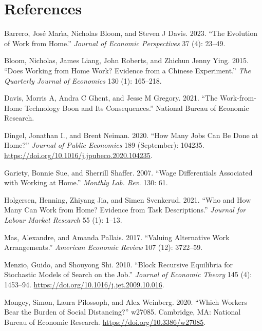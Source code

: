 \documentclass[
  11pt,
  letterpaper,
  DIV=11,
  numbers=noendperiod]{scrartcl}
\newlength{\cslhangindent}
\newenvironment{CSLReferences}[2] %
 {\begin{list}{}{%
  \setlength{\itemindent}{0pt}
  \setlength{\leftmargin}{0pt}
  \setlength{\parsep}{0pt}
  \ifodd #1
   \setlength{\leftmargin}{\cslhangindent}
   \setlength{\itemindent}{-1\cslhangindent}
  \fi
  \setlength{\itemsep}{#2\baselineskip}}}
 {\end{list}}
\theoremstyle{plain}
\theoremstyle{remark}
\begin{document}
\section*{References}\label{references}

\label{refs}
\begin{CSLReferences}{1}{0}
Barrero, José Marı́a, Nicholas Bloom, and Steven J Davis. 2023. {``The
Evolution of Work from Home.''} \emph{Journal of Economic Perspectives}
37 (4): 23--49.

Bloom, Nicholas, James Liang, John Roberts, and Zhichun Jenny Ying.
2015. {``Does Working from Home Work? Evidence from a Chinese
Experiment.''} \emph{The Quarterly Journal of Economics} 130 (1):
165--218.

Davis, Morris A, Andra C Ghent, and Jesse M Gregory. 2021. {``The
Work-from-Home Technology Boon and Its Consequences.''} National Bureau
of Economic Research.

Dingel, Jonathan I., and Brent Neiman. 2020. {``How Many Jobs Can Be
Done at Home?''} \emph{Journal of Public Economics} 189 (September):
104235. \url{https://doi.org/10.1016/j.jpubeco.2020.104235}.

Gariety, Bonnie Sue, and Sherrill Shaffer. 2007. {``Wage Differentials
Associated with Working at Home.''} \emph{Monthly Lab. Rev.} 130: 61.

Holgersen, Henning, Zhiyang Jia, and Simen Svenkerud. 2021. {``Who and
How Many Can Work from Home? Evidence from Task Descriptions.''}
\emph{Journal for Labour Market Research} 55 (1): 1--13.

Mas, Alexandre, and Amanda Pallais. 2017. {``Valuing Alternative Work
Arrangements.''} \emph{American Economic Review} 107 (12): 3722--59.

Menzio, Guido, and Shouyong Shi. 2010. {``Block Recursive Equilibria for
Stochastic Models of Search on the Job.''} \emph{Journal of Economic
Theory} 145 (4): 1453--94.
\url{https://doi.org/10.1016/j.jet.2009.10.016}.

Mongey, Simon, Laura Pilossoph, and Alex Weinberg. 2020. {``Which
{Workers Bear} the {Burden} of {Social Distancing}?''} w27085.
Cambridge, MA: National Bureau of Economic Research.
\url{https://doi.org/10.3386/w27085}.

\end{CSLReferences}
\end{document}

